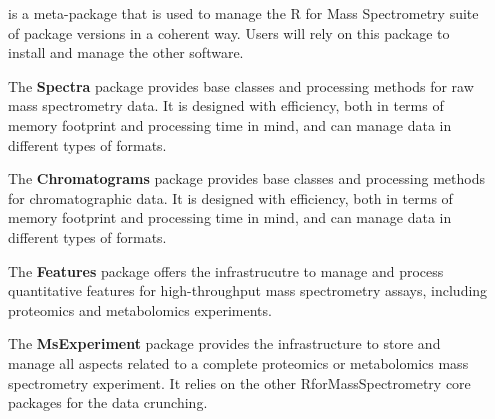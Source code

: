 \documentclass[final]{beamer}
\newcommand{\bpkg}[1]{{\textbf{#1}}}
\begin{document}
\begin{frame}[fragile]
\begin{columns}[T]
\begin{column}{.2\textwidth}
    \end{column}

    \begin{column}{.4\textwidth}

      \begin{block}{}
        \justifying \bpkg{RforMassSpectrometry} is a meta-package that
        is used to manage the R for Mass Spectrometry suite of package
        versions in a coherent way. Users will rely on this package to
        install and manage the other software.
      \end{block}

      \vspace{1cm}

      \begin{block}{}
        \justifying The \bpkg{Spectra} package provides base classes
        and processing methods for raw mass spectrometry data. It is
        designed with efficiency, both in terms of memory footprint
        and processing time in mind, and can manage data in different
        types of formats.
      \end{block}

      \vspace{1cm}

      \begin{block}{}
        \justifying The \bpkg{Chromatograms} package provides base
        classes and processing methods for chromatographic data. It
        is designed with efficiency, both in terms of memory footprint
        and processing time in mind, and can manage data in different
        types of formats.
      \end{block}

      \vspace{1cm}

      \begin{block}{}
        \justifying The \bpkg{Features} package offers the
        infrastrucutre to manage and process quantitative features for
        high-throughput mass spectrometry assays, including proteomics
        and metabolomics experiments.
      \end{block}

      \vspace{1cm}

      \begin{block}{}
        \justifying The \bpkg{MsExperiment} package provides the
        infrastructure to store and manage all aspects related to a
        complete proteomics or metabolomics mass spectrometry
        experiment. It relies on the other RforMassSpectrometry core
        packages for the data crunching.
      \end{block}


\end{column}
\end{columns}
\end{frame}
\end{document}
